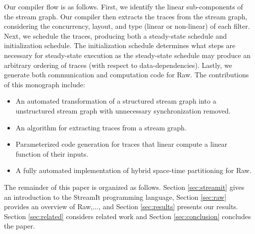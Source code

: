 Our compiler flow is as follows. First, we identify the linear
sub-components of the stream graph.  Our compiler then extracts the
traces from the stream graph, considering the concurrency, layout, and
type (linear or non-linear) of each filter.  Next, we schedule the
traces, producing both a steady-state schedule and initialization
schedule.  The initialization schedule determines what steps are
necessary for steady-state execution as the steady-state schedule may
produce an arbitrary ordering of traces (with respect to
data-dependencies).  Lastly, we generate both communication and
computation code for Raw.  The contributions of this monograph include:
\begin{itemize}
\item An automated transformation of a structured stream graph into a
unstructured stream graph with unnecessary synchronization removed.
\item An algorithm for extracting traces from a stream graph.
\item Parameterized code generation for traces that linear compute a
linear function of their inputs.
\item A fully automated implementation of hybrid space-time
partitioning for Raw.
\end{itemize}

The remainder of this paper is organized as follows.  Section 
\ref{sec:streamit} gives an introduction to the StreamIt programming
language, Section \ref{sec:raw} provides an overview of Raw,...,
and Section \ref{sec:results} presents our results.  Section 
\ref{sec:related} considers related work and Section 
\ref{sec:conclusion} concludes the paper.



